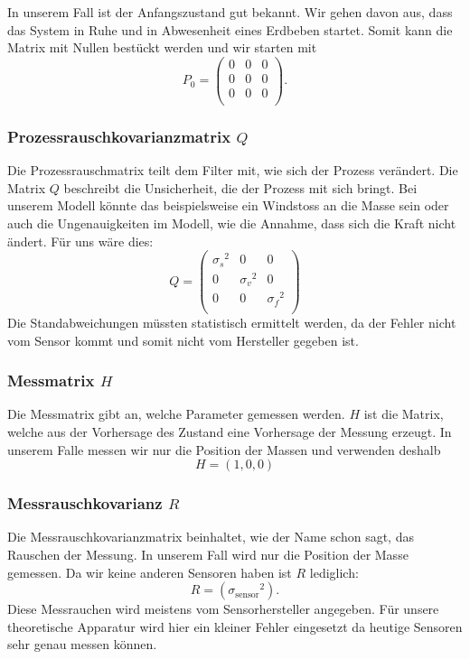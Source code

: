 In unserem Fall ist der Anfangszustand gut bekannt. 
Wir gehen davon aus,
dass das System in Ruhe und in Abwesenheit eines Erdbeben startet.
Somit kann die Matrix mit Nullen bestückt werden und wir starten mit
\[ 
{P_0 }=
\left(
\begin{array}{ccc} 	
0 & 0 &0 \\ 
0 &0 & 0 \\ 
0 & 0 &0 \\
\end{array}
\right).
 \] 


\subsubsection*{Prozessrauschkovarianzmatrix $Q$}
Die Prozessrauschmatrix teilt dem Filter mit, wie sich der Prozess verändert. 
Die Matrix $Q$ beschreibt die Unsicherheit, die der Prozess mit sich bringt. 
Bei unserem Modell könnte das beispielsweise ein Windstoss an die Masse sein
oder auch die Ungenauigkeiten im Modell, wie die Annahme, dass sich die Kraft nicht ändert.
Für uns wäre dies:
\[ 
Q = \left(
 \begin{array}{ccc} 	
{\sigma_s }^2& 0& 0 \\ 
0 & {\sigma_v }^2& 0\\ 
0 & 0& {\sigma_f }^2\\
\end{array}\right)  
 \]
Die Standabweichungen müssten statistisch ermittelt werden, da der Fehler nicht vom Sensor kommt und somit nicht vom Hersteller gegeben ist. 

\subsubsection*{Messmatrix $H$}
Die Messmatrix gibt an, welche Parameter gemessen werden. 
$H$ ist die Matrix, welche aus der Vorhersage des Zustand eine Vorhersage der Messung erzeugt.
In unserem Falle messen wir nur die Position der Massen und verwenden deshalb
\[ 
H = (1, 0, 0) 
\]

\subsubsection*{Messrauschkovarianz $R$}
Die Messrauschkovarianzmatrix beinhaltet, wie der Name schon sagt, das Rauschen der Messung. 
In unserem Fall wird nur die Position der Masse gemessen. Da wir keine anderen Sensoren haben ist $R$ lediglich:
\[ 
R= ({\sigma_\mathrm{sensor}}^2).
 \] 
Diese Messrauchen wird meistens vom Sensorhersteller angegeben. 
Für unsere theoretische Apparatur wird hier ein kleiner Fehler eingesetzt da heutige Sensoren sehr genau messen können. 

